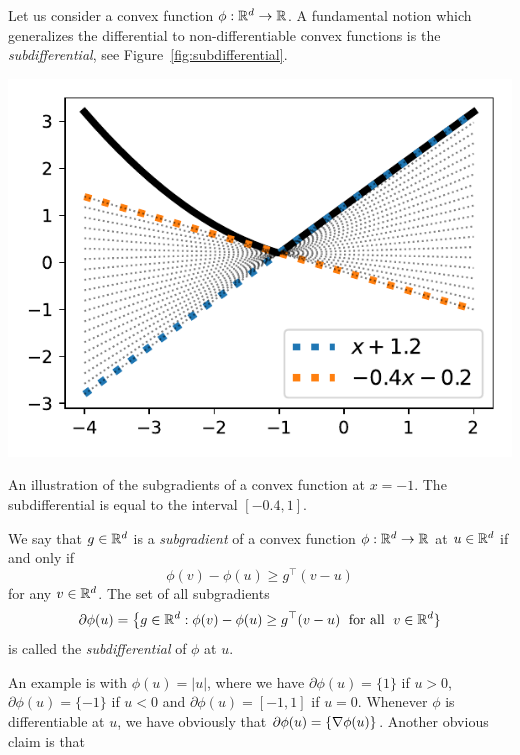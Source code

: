 Let us consider a convex function $\phi : \mathbb R^d \rightarrow \mathbb R$.
A fundamental notion which generalizes the differential to non-differentiable convex functions is the \emph{subdifferential}, see Figure~\ref{fig:subdifferential}.
\begin{marginfigure}
	\includegraphics{assets/subdifferential.pdf}
	\caption{An illustration of the subgradients of a convex function at $x=-1$. The subdifferential is equal to the interval $[-0.4, 1]$.}
	\label{fig:subdifferential}
\end{marginfigure}
\begin{definition}
	\label{def:subdifferential}
	We say that $g \in \mathbb R^d$ is a \emph{subgradient} of a convex function $\phi : \mathbb R^d \rightarrow \mathbb R$ at $u \in \mathbb R^d$ if and only if
	\begin{equation}
	 	\phi(v) - \phi(u) \geq g^\top (v - u)
	 \end{equation} 
	 for any $v \in \mathbb R^d$.
	 The set of all subgradients
	 \begin{equation*}
	 	\partial \phi(u) = \big\{ g \in \mathbb R^d : \phi(v) - \phi(u) \geq g^\top (v -u) 
	 	\; \text{ for all } \; v \in \mathbb R^d \}
	 \end{equation*}
	 is called the \emph{subdifferential} of $\phi$ at $u$.
\end{definition}
An example is with $\phi(u) = |u|$, where we have $\partial \phi(u) = \{ 1 \}$ if $u > 0$, $\partial \phi(u) = \{ -1 \}$ if $u < 0$ and $\partial \phi(u) = [-1, 1]$ if $u = 0$.
Whenever $\phi$ is differentiable at $u$, we have obviously that $\partial \phi(u) = \{  \nabla \phi(u) \}$.
Another obvious claim is that
